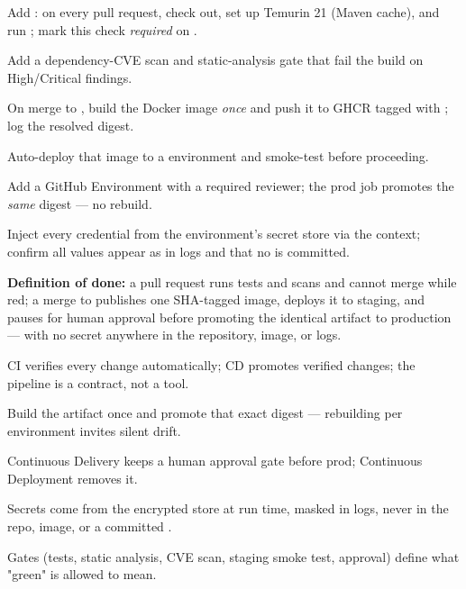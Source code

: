\begin{buildalong}
\begin{wbitem}
  \item Add : on every pull request, check out, set up Temurin 21 (Maven cache), and run ; mark this check \emph{required} on .
  \item Add a dependency-CVE scan and static-analysis gate that fail the build on High/Critical findings.
  \item On merge to , build the Docker image \emph{once} and push it to GHCR tagged with ; log the resolved  digest.
  \item Auto-deploy that image to a  environment and smoke-test  before proceeding.
  \item Add a  GitHub Environment with a required reviewer; the prod job promotes the \emph{same} digest --- no rebuild.
  \item Inject every credential from the environment's secret store via the  context; confirm all values appear as \code{***} in logs and that no  is committed.
\end{wbitem}
\smallskip\textbf{Definition of done:} a pull request runs tests and scans and cannot merge while red; a merge to  publishes one SHA-tagged image, deploys it to staging, and pauses for human approval before promoting the identical artifact to production --- with no secret anywhere in the repository, image, or logs.
\end{buildalong}


\begin{tickcheck}
  \item CI verifies every change automatically; CD promotes verified changes; the pipeline is a contract, not a tool.
  \item Build the artifact once and promote that exact digest --- rebuilding per environment invites silent drift.
  \item Continuous Delivery keeps a human approval gate before prod; Continuous Deployment removes it.
  \item Secrets come from the encrypted store at run time, masked in logs, never in the repo, image, or a committed .
  \item Gates (tests, static analysis, CVE scan, staging smoke test, approval) define what "green" is allowed to mean.
\end{tickcheck}

